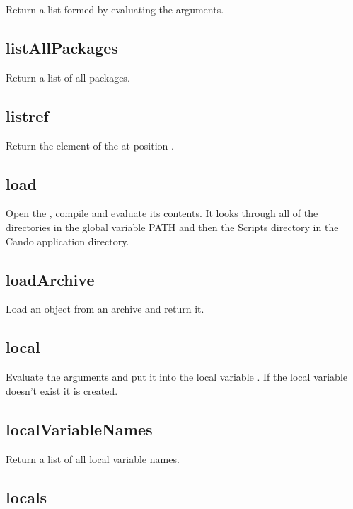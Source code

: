 \begin{itemize}
  Return a list formed by evaluating the arguments.

\subsection{listAllPackages}

  Return a list of all packages.

\subsection{listref}

  Return the element of the  at position .

\subsection{load}

  Open the , compile and evaluate its contents.
  It looks through all of the directories in the global variable PATH and then 
  the Scripts directory in the Cando application directory.


\subsection{loadArchive}

Load an object from an archive and return it.


\subsection{local}
  \par

  Evaluate the arguments and put it into the local variable . If the local variable doesn't exist it is created.

\subsection{localVariableNames}

  Return a list of all local variable names.

\subsection{locals}


\end{itemize}
